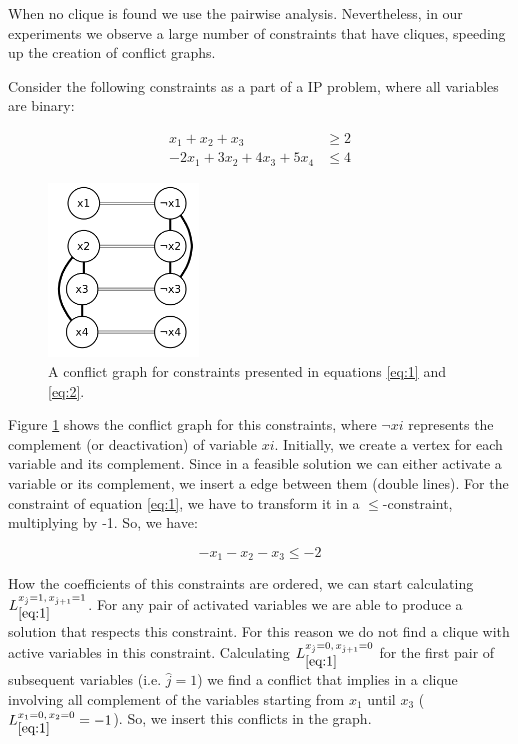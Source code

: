 \documentclass{endm}
\begin{document}
When no clique is found we use the pairwise analysis. Nevertheless, in our experiments we observe a large number of constraints that have cliques, speeding up the creation of conflict graphs.

\begin{example}

Consider the following constraints as a part of a IP problem, where all variables are binary:

\begin{align}
x_1 + x_2 + x_3  & \geq 2\label{eq:1}\\
- 2x_1 + 3x_2 + 4x_3 + 5x_4 & \leq 4\label{eq:2}
\end{align}

\begin{figure}[!ht]
  \begin{center}
    \includegraphics[width=4cm]{graph.png}
  \end{center}
  \caption{A conflict graph for constraints presented in equations \ref{eq:1} and \ref{eq:2}.}
  \label{graph}
\end{figure}

Figure \ref{graph} shows the conflict graph for this constraints, where $\neg xi$ represents the complement (or deactivation) of variable $xi$. Initially, we create a vertex for each variable and its complement. Since in a feasible solution we can either activate a variable or its complement, we insert a edge between them (double lines). For the constraint of equation \ref{eq:1}, we have to transform it in a $\leq$-constraint, multiplying by -1. So, we have:

\begin{equation}
- x_1 - x_2 - x_3 \leq - 2
\end{equation}

How the coefficients of this constraints are ordered, we can start calculating $L_{\ref{eq:1}}^{x_{\hat{j}}=1,\, x_{\hat{j}+1}=1}$. For any pair of activated variables we are able to produce a solution that respects this constraint. For this reason we do not find a clique with active variables in this constraint. Calculating $L_{\ref{eq:1}}^{x_{\hat{j}}=0,\, x_{\hat{j}+1}=0}$ for the first pair of subsequent variables (i.e. $\hat{j}=1$) we find a conflict that implies in a clique involving all complement of the variables starting from $x_1$ until $x_3$ ($L_{\ref{eq:1}}^{x_1=0,\, x_2=0} = -1$). So, we insert this conflicts in the graph.


\end{example}
\end{document}
